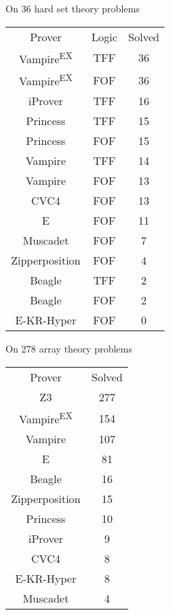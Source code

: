 \begin{frame}{On 36 hard set theory problems}
  \begin{center}
    {\footnotesize
      \begin{tabular}{ccc}
        \hline\noalign{\smallskip}
        Prover & Logic & Solved \\
        \noalign{\smallskip}\hline\noalign{\smallskip}
        Vampire\textsuperscript{EX} & TFF & 36 \\
        Vampire\textsuperscript{EX} & FOF & 36 \\
        iProver & TFF & 16 \\
        Princess & TFF & 15 \\
        Princess & FOF & 15 \\
        Vampire & TFF & 14 \\
        Vampire & FOF & 13 \\
        CVC4 & FOF & 13 \\
        E & FOF & 11 \\
        Muscadet & FOF & 7 \\
        Zipperposition & FOF & 4 \\
        Beagle & TFF & 2 \\
        Beagle & FOF & 2 \\
        E-KR-Hyper & FOF & 0 \\
        \hline
      \end{tabular}
    }
  \end{center}
\end{frame}

\begin{frame}{On 278 array theory problems}
  \begin{center}
    {\small
      \begin{tabular}{cc}
        \hline\noalign{\smallskip}
        Prover & Solved \\
        \noalign{\smallskip}\hline\noalign{\smallskip}
        Z3 & 277 \\
        Vampire\textsuperscript{EX} & 154 \\
        Vampire & 107 \\
        E & 81 \\
        Beagle & 16 \\
        Zipperposition & 15 \\
        Princess & 10 \\
        iProver & 9 \\
        CVC4 & 8 \\
        E-KR-Hyper & 8 \\
        Muscadet & 4 \\
        \hline
      \end{tabular}
    }
  \end{center}
\end{frame}

